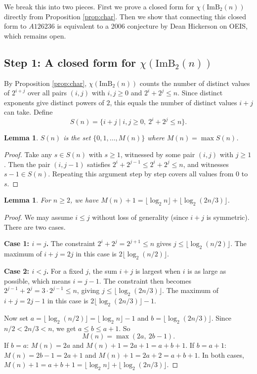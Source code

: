 \documentclass[11pt]{article}
\newtheorem{lemma}[theorem]{Lemma}
\theoremstyle{remark}
\begin{document}
We break this into two pieces. First we prove a closed form for $\chi(\mathrm{ImB}_2(n))$ directly from Proposition \ref{prop:char}. Then we show that connecting this closed form to $A126236$ is equivalent to a 2006 conjecture by Dean Hickerson on OEIS, which remains open.

\subsection*{Step 1: A closed form for $\chi(\mathrm{ImB}_2(n))$}

By Proposition \ref{prop:char}, $\chi(\mathrm{ImB}_2(n))$ counts the number of distinct values of $2^{i+j}$ over all pairs $(i, j)$ with $i, j \geq 0$ and $2^i + 2^j \leq n$. Since distinct exponents give distinct powers of $2$, this equals the number of distinct values $i + j$ can take. Define
\[
S(n) = \{ i + j \mid i, j \geq 0,\ 2^i + 2^j \leq n \}.
\]

\begin{lemma}\label{lem:b2-interval}
$S(n)$ is the set $\{0, 1, \dots, M(n)\}$ where $M(n) = \max S(n)$.
\end{lemma}

\begin{proof}
Take any $s \in S(n)$ with $s \geq 1$, witnessed by some pair $(i, j)$ with $j \geq 1$. Then the pair $(i, j-1)$ satisfies $2^i + 2^{j-1} \leq 2^i + 2^j \leq n$, and witnesses $s - 1 \in S(n)$. Repeating this argument step by step covers all values from $0$ to $s$.
\end{proof}

\begin{lemma}\label{lem:b2-max}
For $n \geq 2$, we have $M(n) + 1 = \lfloor \log_2 n \rfloor + \lfloor \log_2(2n/3) \rfloor$.
\end{lemma}

\begin{proof}
We may assume $i \leq j$ without loss of generality (since $i + j$ is symmetric). There are two cases.

\textbf{Case 1: $i = j$.} The constraint $2^i + 2^j = 2^{j+1} \leq n$ gives $j \leq \lfloor \log_2(n/2) \rfloor$. The maximum of $i + j = 2j$ in this case is $2\lfloor \log_2(n/2) \rfloor$.

\textbf{Case 2: $i < j$.} For a fixed $j$, the sum $i + j$ is largest when $i$ is as large as possible, which means $i = j - 1$. The constraint then becomes $2^{j-1} + 2^j = 3 \cdot 2^{j-1} \leq n$, giving $j \leq \lfloor \log_2(2n/3) \rfloor$. The maximum of $i + j = 2j - 1$ in this case is $2\lfloor \log_2(2n/3) \rfloor - 1$.

Now set $a = \lfloor \log_2(n/2) \rfloor = \lfloor \log_2 n \rfloor - 1$ and $b = \lfloor \log_2(2n/3) \rfloor$. Since $n/2 < 2n/3 < n$, we get $a \leq b \leq a + 1$. So
\[
M(n) = \max(2a,\ 2b - 1).
\]
If $b = a$: $M(n) = 2a$ and $M(n) + 1 = 2a + 1 = a + b + 1$. If $b = a + 1$: $M(n) = 2b - 1 = 2a + 1$ and $M(n) + 1 = 2a + 2 = a + b + 1$. In both cases, $M(n) + 1 = a + b + 1 = \lfloor \log_2 n \rfloor + \lfloor \log_2(2n/3) \rfloor$.
\end{proof}
\end{document}
